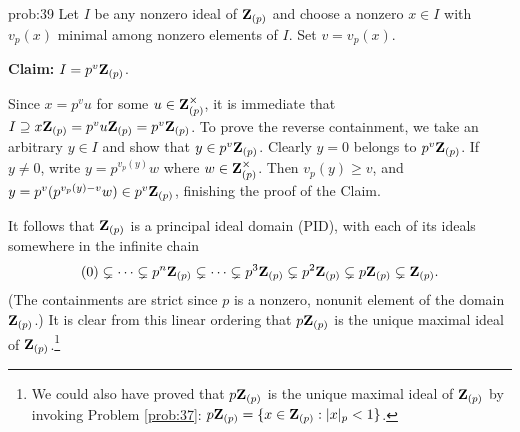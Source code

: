 \begin{sol}{prob:39} Let $I$ be any nonzero ideal of $\mathbf{Z}_{(p)}$ and choose a nonzero $x \in I$ with $v_p(x)$ minimal among nonzero elements of $I$. Set $v=v_p(x)$.

\textbf{Claim:} $I = p^v \mathbf{Z}_{(p)}$.

Since $x=p^v u$ for some $u \in \mathbf{Z}_{(p)}^{\times}$, it is immediate that $I \supseteq x\mathbf{Z}_{(p)} = p^v u\mathbf{Z}_{(p)} = p^v \mathbf{Z}_{(p)}$. To prove the reverse containment, we take an arbitrary $y \in I$ and show that $y \in p^v \mathbf{Z}_{(p)}$. Clearly $y=0$ belongs to $p^v\mathbf{Z}_{(p)}$. If $y\ne 0$, write $y = p^{v_p(y)} w$ where $w \in \mathbf{Z}_{(p)}^{\times}$. Then $v_p(y)\ge v$, and $y = p^{v} (p^{v_p(y)-v} w) \in p^v \mathbf{Z}_{(p)}$, finishing the proof of the Claim.

It follows that $\mathbf{Z}_{(p)}$ is a principal ideal domain (PID), with each of its ideals somewhere in the infinite chain
\[ (0) \subsetneq \dots \subsetneq p^{n} \mathbf{Z}_{(p)} \subsetneq \dots \subsetneq p^{3}\mathbf{Z}_{(p)} \subsetneq p^{2} \mathbf{Z}_{(p)} \subsetneq p \mathbf{Z}_{(p)} \subsetneq \mathbf{Z}_{(p)}. \]
(The containments are strict since $p$ is a nonzero, nonunit element of the domain $\mathbf{Z}_{(p)}$.) It is clear from this linear ordering that $p\mathbf{Z}_{(p)}$ is the unique maximal ideal of $\mathbf{Z}_{(p)}$.\footnote{We could also have proved that $p\mathbf{Z}_{(p)}$ is the unique maximal ideal of $\mathbf{Z}_{(p)}$ by invoking Problem \ref{prob:37}: $p\mathbf{Z}_{(p)} = \{x \in \mathbf{Z}_{(p)}: |x|_p < 1\}$.} 
\end{sol}

